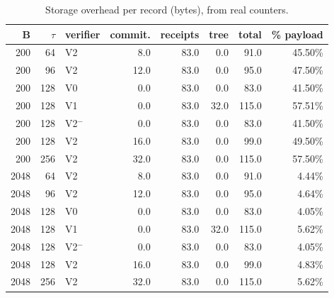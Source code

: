 \begin{table}[t]
  \centering
  \caption{Storage overhead per record (bytes), from real counters.}
  \label{tab:storage}
  \begin{tabular}{rrlrrrrr}
    \toprule
    B & $\tau$ & verifier & commit. & receipts & tree & total & \% payload \\
    \midrule
    200 & 64 & V2 & 8.0 & 83.0 & 0.0 & 91.0 & 45.50\% \\
    200 & 96 & V2 & 12.0 & 83.0 & 0.0 & 95.0 & 47.50\% \\
    200 & 128 & V0 & 0.0 & 83.0 & 0.0 & 83.0 & 41.50\% \\
    200 & 128 & V1 & 0.0 & 83.0 & 32.0 & 115.0 & 57.51\% \\
    200 & 128 & V2$^{-}$ & 0.0 & 83.0 & 0.0 & 83.0 & 41.50\% \\
    200 & 128 & V2 & 16.0 & 83.0 & 0.0 & 99.0 & 49.50\% \\
    200 & 256 & V2 & 32.0 & 83.0 & 0.0 & 115.0 & 57.50\% \\
    2048 & 64 & V2 & 8.0 & 83.0 & 0.0 & 91.0 & 4.44\% \\
    2048 & 96 & V2 & 12.0 & 83.0 & 0.0 & 95.0 & 4.64\% \\
    2048 & 128 & V0 & 0.0 & 83.0 & 0.0 & 83.0 & 4.05\% \\
    2048 & 128 & V1 & 0.0 & 83.0 & 32.0 & 115.0 & 5.62\% \\
    2048 & 128 & V2$^{-}$ & 0.0 & 83.0 & 0.0 & 83.0 & 4.05\% \\
    2048 & 128 & V2 & 16.0 & 83.0 & 0.0 & 99.0 & 4.83\% \\
    2048 & 256 & V2 & 32.0 & 83.0 & 0.0 & 115.0 & 5.62\% \\
    \bottomrule
  \end{tabular}
\end{table}
